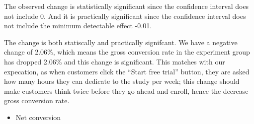 \documentclass[11pt]{article}
\providecommand{\tightlist}{%
      \setlength{\itemsep}{0pt}\setlength{\parskip}{0pt}}
\begin{document}
    The observed change is statistically significant since the confidence
interval does not include 0. And it is practically significant since the
confidence interval does not include the minimum detectable effect
-0.01.

    The change is both statiscally and practically signifcant. We have a
negative change of 2.06\%, which means the gross conversion rate in the
experiment group has dropped 2.06\% and this change is significant. This
matches with our expecation, as when customers click the ``Start free
trial'' button, they are asked how many hours they can dedicate to the
study per week; this change should make customers think twice before
they go ahead and enroll, hence the decrease gross conversion rate.

    \begin{itemize}
\tightlist
\item
  Net conversion
\end{itemize}
\end{document}
